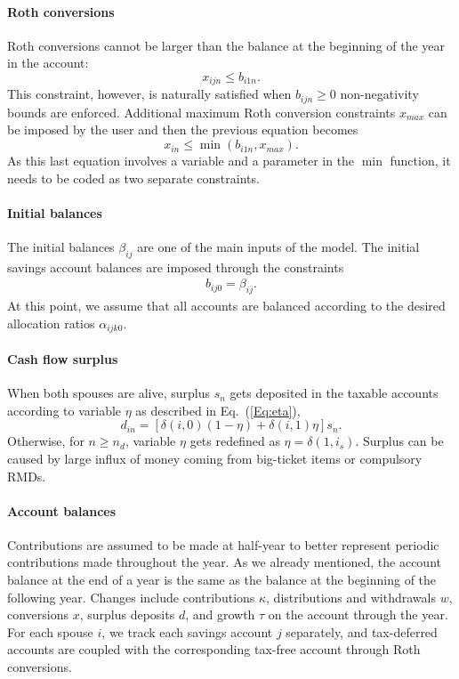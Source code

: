 \documentclass{report}[fleqn,12pt]
\begin{document}
\paragraph*{Roth conversions}
	Roth conversions cannot be larger than the balance at the beginning of the year in the account:
	\begin{equation}
		x_{ijn} \le b_{i1n}.
	\end{equation}
	This constraint, however, is naturally satisfied when $b_{ijn} \ge 0$ non-negativity bounds are enforced.
	Additional maximum Roth conversion constraints $x_{max}$ can be imposed by the user and
	then the previous equation becomes
	\begin{equation}
		x_{in} \le \min(b_{i1n}, x_{max}).
	\end{equation}
	As this last equation involves a variable and a parameter in the $\min$ function,
	it needs to be coded as two separate constraints.

\paragraph*{Initial balances}
	The initial balances $\beta_{ij}$ are one of the main inputs of the model.
	The initial savings account balances are imposed through the constraints
	\begin{eqnarray}
		\label{Eq:InitialBalance}
		b_{ij0} = \beta_{ij}.
	\end{eqnarray}
	At this point, we assume that all accounts are balanced according to the desired
	allocation ratios $\alpha_{ijk0}$.

\paragraph*{Cash flow surplus}
	When both spouses are alive, surplus $s_n$ gets deposited in the taxable accounts
	according to variable $\eta$ as described in Eq.~(\ref{Eq:eta}),
	\begin{equation}
		\label{Eq:eta2}
		d_{in} = [\delta(i, 0)(1 - \eta) + \delta(i, 1)\eta] s_n .
	\end{equation}
	Otherwise, for $n \ge n_d$, variable $\eta$ gets redefined as $\eta = \delta(1, i_s)$.
	Surplus can be caused by large influx of money coming from big-ticket items or compulsory RMDs.

\paragraph*{Account balances}
	Contributions are assumed to be made at half-year to better represent periodic contributions
	made throughout the year. As we already mentioned,
	the account balance at the end of a year is the same as the balance
	at the beginning of the following year.
	Changes include contributions $\kappa$, distributions and withdrawals $w$,
	conversions $x$, surplus deposits $d$, and growth $\tau$ on the account through the year.
	For each spouse $i$, we track each savings account $j$ separately, and tax-deferred accounts
	are coupled with the corresponding tax-free account through Roth conversions.
\end{document}

